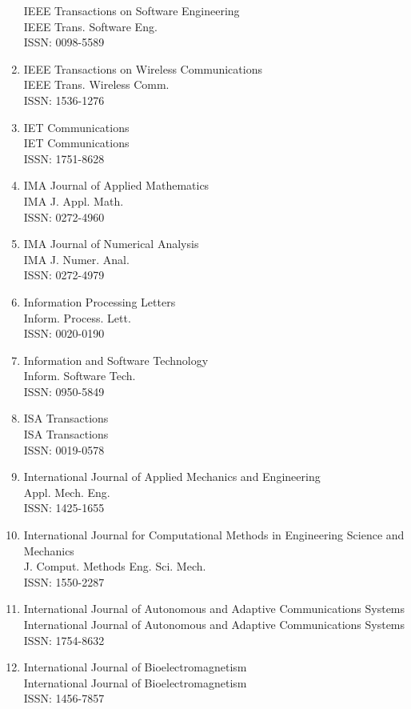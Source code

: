\begin{enumerate}
 IEEE Transactions on Software Engineering\\
 IEEE Trans. Software Eng.\\
 ISSN: 0098-5589
\item
 IEEE Transactions on Wireless Communications\\
 IEEE Trans. Wireless Comm.\\
 ISSN: 1536-1276
\item
 IET Communications\\
 IET Communications\\
 ISSN: 1751-8628
\item
 IMA Journal of Applied Mathematics\\
 IMA J. Appl. Math.\\
 ISSN: 0272-4960
\item
 IMA Journal of Numerical Analysis\\
 IMA J. Numer. Anal.\\
 ISSN: 0272-4979
\item
 Information Processing Letters\\
 Inform. Process. Lett.\\
 ISSN: 0020-0190
\item
 Information and Software Technology\\
 Inform. Software Tech.\\
 ISSN: 0950-5849
\item
 ISA Transactions\\
 ISA Transactions\\
 ISSN: 0019-0578
\item
 International Journal of Applied Mechanics and Engineering\\
 Appl. Mech. Eng.\\
 ISSN: 1425-1655
\item
 International Journal for Computational Methods in Engineering Science and Mechanics\\
 J. Comput. Methods Eng. Sci. Mech.\\
 ISSN: 1550-2287
\item
 International Journal of Autonomous and Adaptive Communications Systems\\
 International Journal of Autonomous and Adaptive Communications Systems\\
 ISSN: 1754-8632
\item
 International Journal of Bioelectromagnetism\\
 International Journal of Bioelectromagnetism\\
 ISSN: 1456-7857

\end{enumerate}
